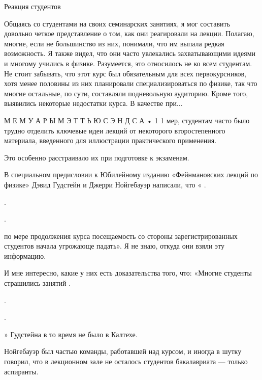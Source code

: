 \documentclass[10pt,oneside]{article}
\begin{document}
Реакция студентов\par

Общаясь со студентами на своих семинарских занятиях, я мог составить довольно четкое представление о том, как они реагировали на лекции. Полагаю, многие, если не большинство из них, понимали, что им выпала редкая возможность. Я также видел, что они часто увлекались захватывающими идеями и многому учились в физике. Разумеется, это относилось не ко всем студентам. Не стоит забывать, что этот курс был обязательным для всех первокурсников, хотя менее половины из них планировали специализироваться по физике, так что многие остальные, по сути, составляли подневольную аудиторию. Кроме того, выявились некоторые недостатки курса. В качестве при...\par

М Е М У А Р Ы  М Э Т Т Ь Ю  С Э Н Д С А • 1 1 мер, студентам часто было трудно отделить ключевые идеи лекций от некоторого второстепенного материала, введенного для иллюстрации практического применения.\par

Это особенно расстраивало их при подготовке к экзаменам.\par

В специальном предисловии к Юбилейному изданию «Фейнмановских лекций по физике» Дэвид Гудстейн и Джерри Нойгебауэр написали, что « .\par

.\par

.\par

по мере продолжения курса посещаемость со стороны зарегистрированных студентов начала угрожающе падать». Я не знаю, откуда они взяли эту информацию.\par

И мне интересно, какие у них есть доказательства того, что: «Многие студенты страшились занятий .\par

.\par

.\par

» Гудстейна в то время не было в Калтехе.\par

Нойгебауэр был частью команды, работавшей над курсом, и иногда в шутку говорил, что в лекционном зале не осталось студентов бакалавриата --- только аспиранты.\par
\end{document}
